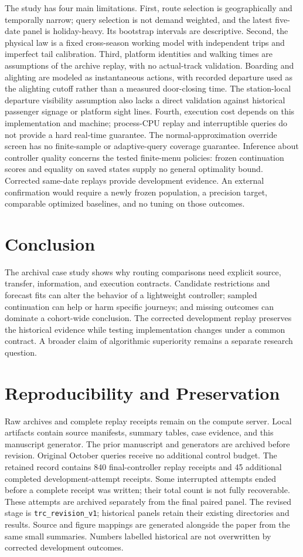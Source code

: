 \documentclass[preprint,12pt,authoryear]{elsarticle}
\begin{document}
The study has four main limitations. First, route selection is geographically
and temporally narrow; query selection is not demand weighted, and the latest
five-date panel is holiday-heavy. Its bootstrap intervals are descriptive. Second,
the physical law is a fixed cross-season working model with independent trips
and imperfect tail calibration. Third, platform identities and walking times
are assumptions of the archive replay, with no actual-track validation.
Boarding and alighting are modeled as instantaneous actions, with recorded
departure used as the alighting cutoff rather than a measured door-closing time.
The station-local departure visibility assumption also lacks a direct
validation against historical passenger signage or platform sight lines. Fourth,
execution cost depends on this implementation and machine; process-CPU replay
and interruptible queries do not provide a hard real-time guarantee. The
normal-approximation override screen has no finite-sample or adaptive-query
coverage guarantee. Inference about controller quality concerns the tested
finite-menu policies: frozen continuation scores and equality on saved states
supply no general optimality bound. Corrected
same-date replays provide development evidence. An external confirmation would
require a newly frozen population, a precision target, comparable optimized
baselines, and no tuning on those outcomes.

\section{Conclusion}
The archival case study shows why routing comparisons need explicit source,
transfer, information, and execution contracts. Candidate restrictions and
forecast fits can alter the behavior of a lightweight controller; sampled continuation can
help or harm specific journeys; and missing outcomes can dominate a cohort-wide
conclusion. The corrected development replay preserves the historical evidence
while testing implementation changes under a common contract. A broader claim
of algorithmic superiority remains a separate research question.

\appendix
\section{Reproducibility and Preservation}
Raw archives and complete replay receipts remain on the compute server. Local
artifacts contain source manifests, summary tables, case evidence, and this
manuscript generator. The prior manuscript and generators are archived before
revision. Original October queries receive no additional control budget.
The retained record contains 840 final-controller replay receipts and 45 additional completed development-attempt receipts. Some interrupted attempts ended before a complete receipt was written; their total count is not fully recoverable. These attempts are archived separately from the final paired panel.
The revised stage is \texttt{trc\_revision\_v1}; historical panels retain their
existing directories and results. Source and figure mappings are generated
alongside the paper from the same small summaries. Numbers labelled historical
are not overwritten by corrected development outcomes.
\end{document}
